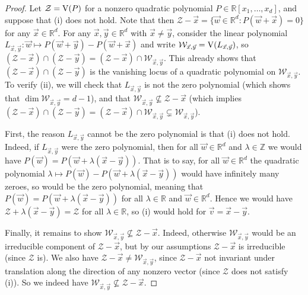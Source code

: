 \documentclass[english]{article}
\theoremstyle{remark}
\numberwithin{equation}{section}
\numberwithin{figure}{section}
\newcommand{\su}{\subseteq}
\newcommand{\RR}{\mathbb{R}}
\newcommand{\ZZ}{\mathbb{Z}}
\begin{document}
\begin{proof}
Let $\mathcal{Z}=\operatorname{V}(P)$ for a nonzero quadratic polynomial $P\in \RR[x_1,\dots,x_d]$, and suppose that (i) does not hold. Note that then $\mathcal{Z}-\vec x=\{\vec{w}\in \RR^d: P(\vec w+\vec x)=0\}$ for any $\vec x\in \RR^d$.  For any $\vec{x},\vec{y}\in \RR^d$ with $\vec{x}\ne\vec{y}$, consider the linear polynomial $L_{\vec{x},\vec{y}}:\vec w\mapsto P(\vec{w}+\vec{y})-P(\vec{w}+\vec{x})$ and write $\mathcal{W}_{\vec{x},\vec{y}}=\operatorname{V}(L_{\vec{x},\vec{y}})$, so $(\mathcal{Z}-\vec{x})\cap(\mathcal{Z}-\vec{y})=(\mathcal{Z}-\vec{x})\cap\mathcal{W}_{\vec{x},\vec{y}}$. This already shows that $(\mathcal{Z}-\vec{x})\cap(\mathcal{Z}-\vec{y})$ is the vanishing locus of a quadratic polynomial on $\mathcal{W}_{\vec{x},\vec{y}}$. To verify (ii), we will check that $L_{\vec{x},\vec{y}}$ is not the zero polynomial (which shows that $\dim \mathcal{W}_{\vec{x},\vec{y}}=d-1$), and that $\mathcal{W}_{\vec{x},\vec{y}}\not \su \mathcal{Z}-\vec x$ (which implies $(\mathcal{Z}-\vec{x})\cap(\mathcal{Z}-\vec{y})=(\mathcal{Z}-\vec{x})\cap\mathcal{W}_{\vec{x},\vec{y}}\subsetneq \mathcal{W}_{\vec{x},\vec{y}}$).

First, the reason $L_{\vec{x},\vec{y}}$ cannot be the zero polynomial
is that (i) does not hold. Indeed, if $L_{\vec{x},\vec{y}}$ were
the zero polynomial, then for all $\vec{w}\in\RR^{d}$ and $\lambda\in\ZZ$
we would have $P(\vec{w})=P(\vec{w}+\lambda(\vec{x}-\vec{y}))$.
That is to say, for all $\vec{w}\in\RR^{d}$ the quadratic polynomial
$\lambda\mapsto P(\vec{w})-P(\vec{w}+\lambda(\vec{x}-\vec{y}))$ would
have infinitely many zeroes, so would be the zero polynomial, meaning
that $P(\vec{w})=P(\vec{w}+\lambda(\vec{x}-\vec{y}))$ for all $\lambda\in\RR$ and $\vec{w}\in\RR^{d}$. Hence we would have $\mathcal{Z}+\lambda(\vec{x}-\vec{y})=\mathcal{Z}$ for all $\lambda\in\RR$, so (i) would hold for $\vec{v}=\vec{x}-\vec{y}$.

Finally, it remains to show $\mathcal{W}_{\vec{x},\vec{y}}\not \su \mathcal{Z}-\vec x$. Indeed, otherwise $\mathcal{W}_{\vec{x},\vec{y}}$ would be an irreducible component of $\mathcal{Z}-\vec x$, but by our assumptions $\mathcal{Z}-\vec x$  is irreducible (since $\mathcal{Z}$ is). We also have $\mathcal{Z}-\vec x\ne \mathcal{W}_{\vec{x},\vec{y}}$, since $\mathcal{Z}-\vec x$ not invariant under translation along the direction of any nonzero vector (since $\mathcal{Z}$ does not satisfy (i)). So we indeed have $\mathcal{W}_{\vec{x},\vec{y}}\not \su \mathcal{Z}-\vec x$.
\end{proof}
\end{document}

